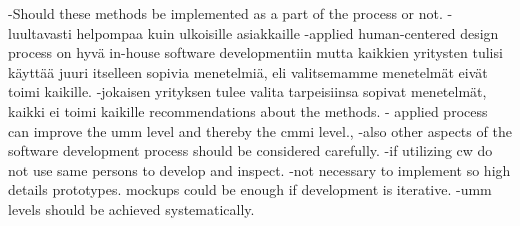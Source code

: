\documentclass[12pt,a4paper,oneside,pdftex]{report}
\begin{document}
    -Should these methods be implemented as a part of the process or not.
-luultavasti helpompaa kuin ulkoisille asiakkaille
-applied human-centered design process on hyvä in-house software developmentiin mutta kaikkien yritysten tulisi käyttää juuri itselleen sopivia menetelmiä, eli valitsemamme menetelmät eivät toimi kaikille.
-jokaisen yrityksen tulee valita tarpeisiinsa sopivat menetelmät, kaikki ei toimi kaikille
recommendations about the methods.
- applied process can improve the umm level and thereby the cmmi level.,
-also other aspects of the software development process should be considered carefully. 
-if utilizing cw do not use same persons to develop and inspect.
-not necessary to implement so high details prototypes. mockups could be enough if development is iterative.
-umm levels should be achieved systematically.







\end{document}
